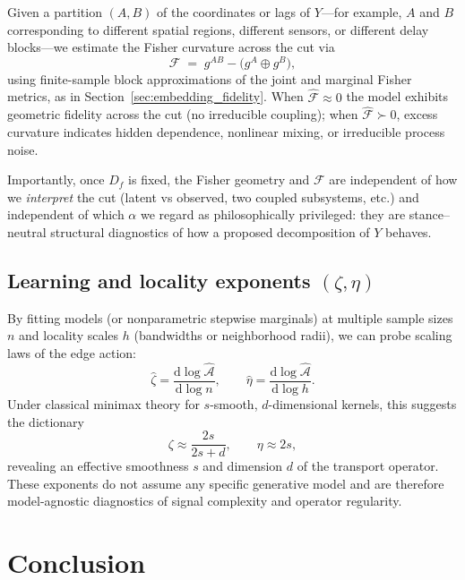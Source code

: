 \documentclass[11pt]{article}
\newcommand{\1}{\mathbf{1}}
\begin{document}
Given a partition \((A,B)\) of the coordinates or lags of \(Y\)---for example, \(A\) and \(B\) corresponding to different spatial regions, different sensors, or different delay blocks---we estimate the Fisher curvature across the cut via
\[
  \mathcal{F}
  \;=\;
  g^{AB} - \bigl(g^A \oplus g^B\bigr),
\]
using finite-sample block approximations of the joint and marginal Fisher metrics, as in Section~\ref{sec:embedding_fidelity}. When \(\widehat{\mathcal{F}}\approx 0\) the model exhibits geometric fidelity across the cut (no irreducible coupling); when \(\widehat{\mathcal{F}}\succ 0\), excess curvature indicates hidden dependence, nonlinear mixing, or irreducible process noise.

Importantly, once \(D_f\) is fixed, the Fisher geometry and \(\mathcal{F}\) are independent of how we \emph{interpret} the cut (latent vs observed, two coupled subsystems, etc.) and independent of which \(\alpha\) we regard as philosophically privileged: they are stance–neutral structural diagnostics of how a proposed decomposition of \(Y\) behaves.


\subsection{Learning and locality exponents \texorpdfstring{$(\zeta,\eta)$}{(zeta, eta)}}

By fitting models (or nonparametric stepwise marginals) at multiple sample sizes \(n\) and locality scales \(h\) (bandwidths or neighborhood radii), we can probe scaling laws of the edge action:
\[
  \widehat{\zeta}
  =
  \frac{\mathrm d\log \widehat{\mathcal{A}}}{\mathrm d\log n},
  \qquad
  \widehat{\eta}
  =
  \frac{\mathrm d\log \widehat{\mathcal{A}}}{\mathrm d\log h}.
\]
Under classical minimax theory for \(s\)-smooth, \(d\)-dimensional kernels, this suggests the
dictionary
\[
  \zeta \approx \frac{2s}{2s+d},
  \qquad
  \eta \approx 2s,
\]
revealing an effective smoothness \(s\) and dimension \(d\) of the transport operator. These exponents do not assume any specific generative model and are therefore model-agnostic diagnostics of signal complexity and operator regularity.


\newpage

 \section{Conclusion}
\end{document}
